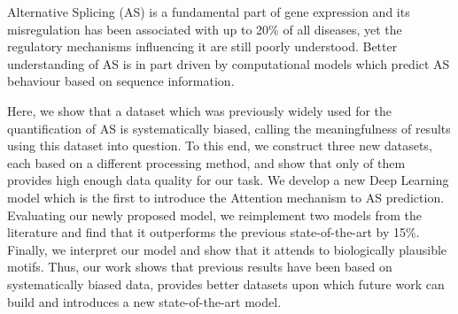 
Alternative Splicing (AS) is a fundamental part of gene expression and its misregulation has been associated with up to 20\% of all diseases, yet the regulatory mechanisms influencing it are still poorly understood. Better understanding of AS is in part driven by computational models which predict AS behaviour based on sequence information. 

Here, we show that a dataset which was previously widely used for the quantification of AS is systematically biased, calling the meaningfulness of results using this dataset into question. To this end, we construct three new datasets, each based on a different processing method, and show that only of them provides high enough data quality for our task. We develop a new Deep Learning model which is the first to introduce the Attention mechanism to AS prediction. Evaluating our newly proposed model, we reimplement two models from the literature and find that it outperforms the previous state-of-the-art by 15\%. Finally, we interpret our model and show that it attends to biologically plausible motifs. 
Thus, our work shows that previous results have been based on systematically biased data,
provides better datasets upon which future work can build and introduces a new state-of-the-art model. 

